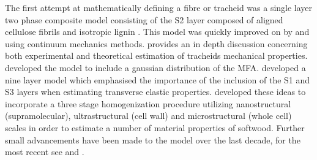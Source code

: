  The first attempt at mathematically defining a fibre or tracheid was a single layer two phase composite model consisting of the S2 layer composed of aligned cellulose fibrils and isotropic lignin \citep{Barber_1964}. This model was quickly improved on by \citet{mark1967cell} and \citet{Cave_1968} using continuum mechanics methods. \citet{mark1967cell} provides an in depth discussion concerning both experimental and theoretical estimation of tracheids mechanical properties. \citet{Cave_1968} developed the model to include a gaussian distribution of the MFA. \citet{bergander2002cell} developed a nine layer model which emphasised the importance of the inclusion of the S1 and S3 layers when estimating transverse elastic properties. \citet{harrington2002hierarchical} developed these ideas to incorporate a three stage homogenization procedure utilizing nanostructural (supramolecular), ultrastructural (cell wall) and microstructural (whole cell) scales in order to estimate a number of material properties of softwood. Further small advancements have been made to the model over the last decade, for the most recent see \citet{Sun_2014,Saavedra_Flores_2014,wang2013gradual} and \citet{faisal2013multiscale}.
 
 

 

